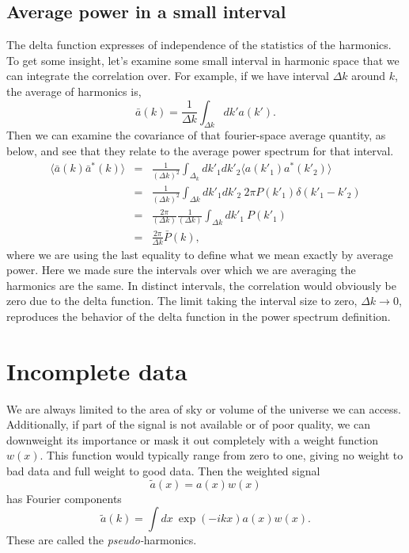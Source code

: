\subsection{Average power in a small interval}
The delta function expresses of independence of the statistics of the harmonics. To get some insight, let's examine some small interval in harmonic space that we can integrate the correlation over.  For example, if we have interval $\Delta k$ around $k$, the average of harmonics is, 
\begin{equation}
  \bar a(k) = \frac{1}{\Delta k} \int_{\Delta k} dk' a(k').
\end{equation}
Then we can examine the covariance of that fourier-space average quantity, as below, and see that they relate to the average power spectrum for that interval. 
\begin{eqnarray}
  \langle \bar a(k)  \bar a^*(k) \rangle &=& \frac{1}{(\Delta k)^2} \int_{\Delta_k} dk'_1 dk'_2 \langle a(k'_1) a^*(k'_2) \rangle \\
  &=& \frac{1}{(\Delta k)^2} \int_{\Delta k} dk'_1 dk'_2 \ 2\pi P(k'_1) \delta(k'_1 - k'_2) \\
  &=& \frac{2\pi}{(\Delta k)} \frac{1}{(\Delta k)}  \int_{\Delta k} dk'_1 \  P(k'_1) \\
  &=& \frac{2\pi}{\Delta k}  \bar P(k), \label{eqn:power_in_interval}
\end{eqnarray}
where we are using the last equality to define what we mean exactly by average power.  Here we made sure the intervals over which we are averaging the harmonics are the same.  In distinct intervals, the correlation would obviously be zero due to the delta function.  The limit taking the interval size to zero, $\Delta k \rightarrow 0$, reproduces the behavior of the delta function in the power spectrum definition.


\section{Incomplete data}

We are always limited to the area of sky or volume of the universe we can access.  Additionally, if part of the signal is not available or of poor quality, we can downweight its importance or mask it out completely with a weight function $w(x)$.  This function would typically range from zero to one, giving no weight to bad data and full weight to good data.  Then the weighted signal
\begin{equation}\tilde a(x) = a(x) w(x)\end{equation}
has Fourier components
\begin{equation}
  \tilde a(k) = \int dx\  \exp(-i k x) a(x) w(x).
\end{equation}
These are called the \textit{pseudo-}harmonics.

